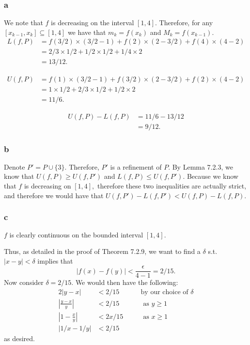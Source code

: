 \documentclass[10pt]{article}
\begin{document}
\subsubsection*{a}
We note that $f$ is decreasing on the interval $[1,4].$ Therefore, for any $[x_{k-1},x_k]\subseteq [1,4]$ we have that $m_k = f(x_k)$ and $M_k=f(x_{k-1}).$
\begin{align*}
    L(f,P) &= f(3/2)\times(3/2-1) + f(2)\times(2-3/2)+f(4)\times(4-2)\\
    &= 2/3\times1/2 + 1/2\times1/2+1/4\times2\\
    &=13/12.
\end{align*}

\begin{align*}
    U(f,P) &= f(1)\times(3/2-1) + f(3/2)\times(2-3/2)+f(2)\times(4-2)\\
    &= 1\times1/2 + 2/3\times1/2+1/2\times2\\
    &=11/6.
\end{align*}

\begin{align*}
    U(f,P)-L(f,P) &= 11/6-13/12\\
    &=9/12.
\end{align*}

\subsubsection*{b}

Denote $P' = P \cup \{3\}.$ Therefore, $P'$ is a refinement of $P.$ By Lemma 7.2.3, we know that $U(f,P)\ge U(f,P')$ and $L(f,P)\le U(f,P').$ Because we know that $f$ is decreasing on $[1,4],$ therefore these two inequalities are actually strict, and therefore we would have that $U(f,P')-L(f,P')<U(f,P)-L(f,P).$
\subsubsection*{c}
$f$ is clearly continuous on the bounded interval $[1,4].$ 

Thus, as detailed in the proof of Theorem 7.2.9, we want to find a $\delta$ s.t. $|x-y|<\delta$ implies that
\begin{equation}
    |f(x)-f(y)|<\frac{\epsilon}{4-1}= 2/15.
\end{equation}
Now consider $\delta = 2/15.$ We would then have the following:
\begin{alignat*}{2}
    |y-x| &< 2/15 &&\text{by our choice of $\delta$}\\
    \left | \frac{y-x}{y} \right | &< 2/15 \quad&&\text{ as $y\ge 1$}\\
    \left | 1 - \frac{x}{y}\right | &< 2x/15 \quad&&\text{ as $x\ge 1$}\\
    \left | 1/x - 1/y\right | &< 2/15
\end{alignat*}
as desired.
\end{document}
